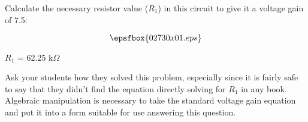 

Calculate the necessary resistor value ($R_1$) in this circuit to give it a voltage gain of 7.5:

$$\epsfbox{02730x01.eps}$$







$R_1$ = 62.25 k$\Omega$







Ask your students how they solved this problem, especially since it is fairly safe to say that they didn't find the equation directly solving for $R_1$ in any book.  Algebraic manipulation is necessary to take the standard voltage gain equation and put it into a form suitable for use answering this question.




